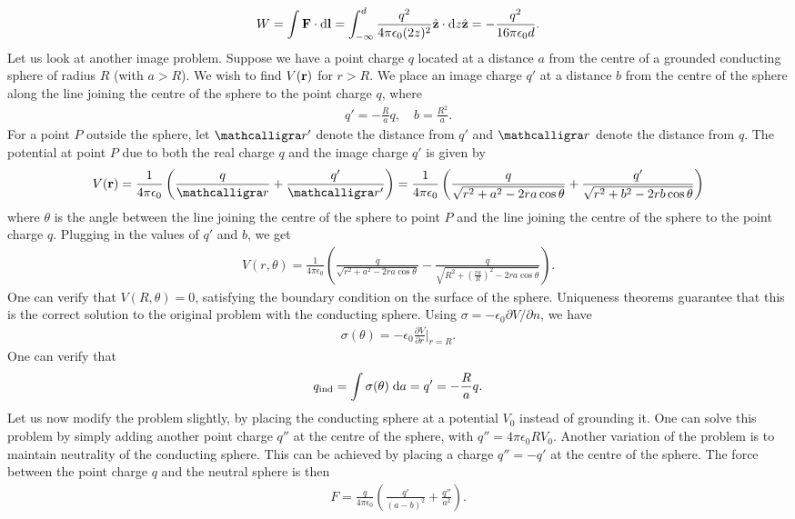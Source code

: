 \begin{align}
    W = \int \mathbf{F} \cdot \mathrm{d}\mathbf{l} = \int_{-\infty}^{d} \frac{q^{2}}{4 \pi \epsilon_{0} (2z)^{2}} \hat{\mathbf{z}} \cdot \mathrm{d}z \hat{\mathbf{z}} = -\frac{q^{2}}{16 \pi \epsilon_{0} d}.
\end{align}
Let us look at another image problem. Suppose we have a point charge $q$ located at a distance $a$ from the centre of a grounded conducting sphere of radius $R$ (with $a > R$). We wish to find $V(\mathbf{r})$ for $r > R$. We place an image charge $q'$ at a distance $b$ from the centre of the sphere along the line joining the centre of the sphere to the point charge $q$, where
\begin{align}
    q' = -\frac{R}{a} q, \quad b = \frac{R^{2}}{a}.
\end{align}
For a point $P$ outside the sphere, let $\curs{r}'$ denote the distance from $q'$ and $\curs{r}$ denote the distance from $q$. The potential at point $P$ due to both the real charge $q$ and the image charge $q'$ is given by
\begin{align}
    V(\bv{r}) = \frac{1}{4 \pi \epsilon_{0}} \left( \frac{q}{\curs{r}} + \frac{q'}{\curs{r}'} \right) = \frac{1}{4 \pi \epsilon_{0}} \left( \frac{q}{\sqrt{r^{2}+a^{2}-2ra \cos \theta}} + \frac{q'}{\sqrt{r^{2}+b^{2}-2rb \cos \theta}} \right)
\end{align}
where $\theta$ is the angle between the line joining the centre of the sphere to point $P$ and the line joining the centre of the sphere to the point charge $q$. Plugging in the values of $q'$ and $b$, we get
\begin{align}
    V(r,\theta) = \frac{1}{4 \pi \epsilon_{0}} \left( \frac{q}{\sqrt{r^{2}+a^{2}-2ra \cos \theta}} - \frac{q}{\sqrt{R^{2} + \left( \frac{ra}{R} \right)^{2} - 2ra \cos \theta}} \right).
\end{align}
One can verify that $V(R,\theta) = 0$, satisfying the boundary condition on the surface of the sphere. Uniqueness theorems guarantee that this is the correct solution to the original problem with the conducting sphere. Using $\sigma = -\epsilon_{0} \partial V/\partial n$, we have
\begin{align}
    \sigma(\theta) = -\epsilon_{0} \frac{\partial V}{\partial r} \bigg|_{r=R}.
\end{align}
One can verify that
\begin{align}
    q_{\text{ind}} = \int \sigma(\theta) \; \mathrm{d}a = q' = -\frac{R}{a} q.
\end{align}
Let us now modify the problem slightly, by placing the conducting sphere at a potential $V_{0}$ instead of grounding it. One can solve this problem by simply adding another point charge $q''$ at the centre of the sphere, with $q'' = 4 \pi \epsilon_{0} R V_{0}$. Another variation of the problem is to maintain neutrality of the conducting sphere. This can be achieved by placing a charge $q'' = -q'$ at the centre of the sphere. The force between the point charge $q$ and the neutral sphere is then
\begin{align}
    F = \frac{q}{4 \pi \epsilon_{0}} \left( \frac{q'}{(a-b)^{2}} + \frac{q''}{a^{2}} \right).
\end{align}


